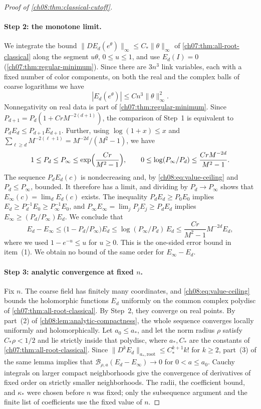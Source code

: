 \begin{proof}[Proof of \cref{ch08:thm:classical-cutoff}]
\paragraph{Step 2: the monotone limit.}
We integrate the bound $\|DE_d(e^\theta)\|_\infty\le C_*\|\theta\|_\infty$ of \cref{ch07:thm:all-root-classical} along the segment $u\theta$, $0\le u\le1$, and use $E_d(I)=0$ (\cref{ch07:thm:regular-minimum}). Since there are $3n^3$ link variables, each with a fixed number of color components, on both the real and the complex balls of coarse logarithms we have
\begin{equation}\label{ch08:eq:value-ceiling}
 |E_d(e^\theta)|\le Cn^3\|\theta\|_\infty^2.
\end{equation}
Nonnegativity on real data is part of \cref{ch07:thm:regular-minimum}. Since $P_{d+1}=P_d(1+CrM^{-2(d+1)})$, the comparison of Step~1 is equivalent to $P_dE_d\le P_{d+1}E_{d+1}$. Further, using $\log(1+x)\le x$ and $\sum_{\ell\ge d}M^{-2(\ell+1)}=M^{-2d}/(M^2-1)$, we have
\[
 1\le P_d\le P_\infty\le
 \exp\Bigl(\frac{Cr}{M^2-1}\Bigr),\qquad
 0\le\log(P_\infty/P_d)\le\frac{CrM^{-2d}}{M^2-1}.
\]
The sequence $P_dE_d(c)$ is nondecreasing and, by \eqref{ch08:eq:value-ceiling} and $P_d\le P_\infty$, bounded. It therefore has a limit, and dividing by $P_d\to P_\infty$ shows that $E_\infty(c)=\lim_dE_d(c)$ exists. The inequality $P_dE_d\ge P_0E_0$ implies $E_d\ge P_d^{-1}E_0\ge P_\infty^{-1}E_0$, and $P_\infty E_\infty=\lim_jP_jE_j\ge P_dE_d$ implies $E_\infty\ge(P_d/P_\infty)E_d$. We conclude that
\[
 E_d-E_\infty\le\bigl(1-P_d/P_\infty\bigr)E_d\le\log(P_\infty/P_d)\,E_d\le\frac{Cr}{M^2-1}M^{-2d}E_d,
\]
where we used $1-e^{-u}\le u$ for $u\ge0$. This is the one-sided error bound in item~(1). We obtain no bound of the same order for $E_\infty-E_d$.

\paragraph{Step 3: analytic convergence at fixed $n$.}
Fix $n$. The coarse field has finitely many coordinates, and \eqref{ch08:eq:value-ceiling} bounds the holomorphic functions $E_d$ uniformly on the common complex polydisc of \cref{ch07:thm:all-root-classical}. By Step~2, they converge on real points. By part~(2) of \cref{ch08:lem:analytic-compactness}, the whole sequence converges locally uniformly and holomorphically. Let $a_0\le a_*$, and let the norm radius $\rho$ satisfy $C_*\rho<1/2$ and lie strictly inside that polydisc, where $a_*,C_*$ are the constants of \cref{ch07:thm:all-root-classical}. Since $\|D^kE_d\|_{a_*,\mathrm{root}}\le C_*^{k+1}k!$ for $k\ge2$, part~(3) of the same lemma implies that $\mathcal B_{\rho,a}(E_d-E_\infty)\to0$ for $0<a\le a_0$. Cauchy integrals on larger compact neighborhoods give the convergence of derivatives of fixed order on strictly smaller neighborhoods. The radii, the coefficient bound, and $\kappa_*$ were chosen before $n$ was fixed; only the subsequence argument and the finite list of coefficients use the fixed value of $n$.


\end{proof}
